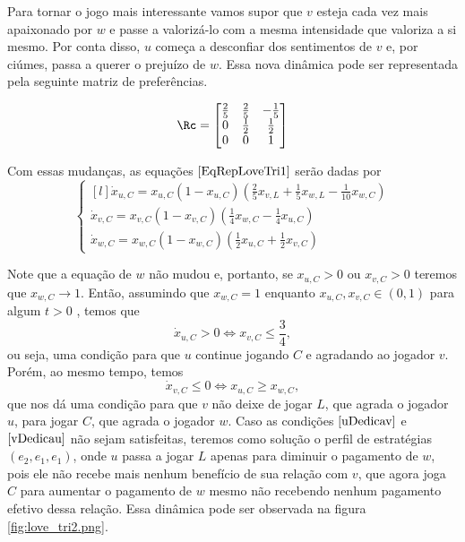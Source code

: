 Para tornar o jogo mais interessante vamos supor que $v$ esteja cada vez mais apaixonado por $w$ e passe a valorizá-lo com a mesma intensidade que valoriza a si mesmo. Por conta disso, $u$ começa a desconfiar dos sentimentos de $v$ e, por ciúmes, passa a querer o prejuízo de $w$. Essa nova dinâmica pode ser representada pela seguinte matriz de preferências.

\begin{equation}
    \label{prefPosLoveTri2}
    \Rc=
    \begin{bmatrix}
        \frac{2}{5} & \frac{2}{5} & -\frac{1}{5}\\ 
        0 & \frac{1}{2} & \frac{1}{2} \\
        0 & 0 & 1
    \end{bmatrix}
\end{equation}

Com essas mudanças, as equações $\eqref{EqRepLoveTri1}$ serão dadas por
\begin{equation}
    \label{EqRepLoveTri2}
    \left\{\begin{matrix*}[l]
        \dot{x}_{u,C}=x_{u,C}(1-x_{u,C})\left(\frac{2}{5}x_{v,L}+\frac{1}{5}x_{w,L} -\frac{1}{10}x_{w,C}\right) \\
        \dot{x}_{v,C}=x_{v,C}(1-x_{v,C})\left(\frac{1}{4}x_{w,C}-\frac{1}{4}x_{u,C}\right) \\
        \dot{x}_{w,C}=x_{w,C}(1-x_{w,C})\left(\frac{1}{2}x_{u,C}+\frac{1}{2}x_{v,C}\right)
    \end{matrix*}\right.
\end{equation}

Note que a equação de $w$ não mudou e, portanto, se $x_{u,C}>0$ ou $x_{v,C}>0$ teremos que $x_{w,C}\to 1$. Então, assumindo que $x_{w,C}=1$ enquanto $x_{u,C},x_{v,C}\in(0,1)$ para algum $t>0$ , temos que
\begin{equation}
    \label{uDedicav}
    \dot{x}_{u,C}>0 \Longleftrightarrow x_{v,C} \leq \frac{3}{4},
\end{equation}
ou seja, uma condição para que $u$ continue jogando $C$ e agradando ao jogador $v$. Porém, ao mesmo tempo, temos
\begin{equation}
    \label{vDedicau}
    \dot{x}_{v,C} \leq 0 \Longleftrightarrow x_{u,C} \geq x_{w,C},
\end{equation}
que nos dá uma condição para que $v$ não deixe de jogar $L$, que agrada o jogador $u$, para jogar $C$, que agrada o jogador $w$. Caso as condições $\eqref{uDedicav}$ e $\eqref{vDedicau}$ não sejam satisfeitas, teremos como solução o perfil de estratégias $(e_2,e_1,e_1)$, onde $u$ passa a jogar $L$ apenas para diminuir o pagamento de $w$, pois ele não recebe mais nenhum benefício de sua relação com $v$, que agora joga $C$ para aumentar o pagamento de $w$ mesmo não recebendo nenhum pagamento efetivo dessa relação. Essa dinâmica pode ser observada na figura \ref{fig:love_tri2.png}.

